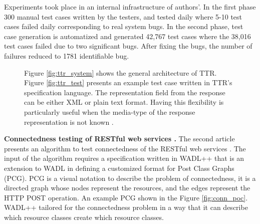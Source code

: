 \documentclass[english]{tktltiki}
\begin{document}
Experiments took place in an internal infrastructure of authors'. In the first phase 300 manual test cases written by the testers, and tested daily where 5-10 test cases failed daily corresponding to real system bugs. In the second phase, test case generation is automatized and generated 42,767 test cases where the 38,016 test cases failed due to two significant bugs. After fixing the bugs, the number of failures reduced to 1781 identifiable bug. 
\begin{figure}[h]
	\centering
	\hfill%
	\caption{Figure \ref{fig:ttr_system} shows the general architecture of TTR. Figure \ref{fig:ttr_test} presents an example test case written in TTR's specification language. The representation field from the response can be either XML or plain text format. Having this flexibility is particularly useful when the media-type of the response representation is not known \cite{chakrabarti2009test}.}
\end{figure}

\textbf{Connectedness testing of RESTful web services \cite{chakrabarti2010connectedness}.} The second article presents an algorithm to test connectedness of the RESTful web services \cite{chakrabarti2010connectedness}. The input of the algorithm requires a specification written in WADL++ that is an extension to WADL in defining a customized format for Post Class Graphs (PCG). PCG is a visual notation to describe the problem of connectedness, it is a directed graph whose nodes represent the resources, and the edges represent the HTTP POST operation. An example PCG shown in the Figure \ref{fig:conn_poc}. WADL++ tailored for the connectedness problem in a way that it can describe which resource classes create which resource classes.
\end{document}
